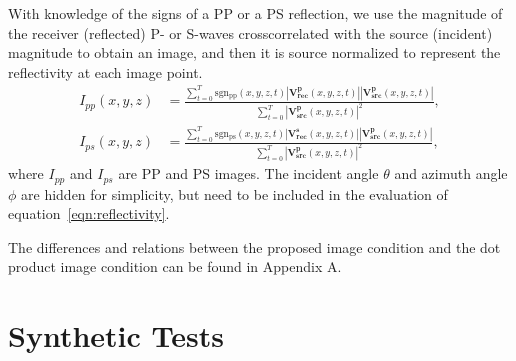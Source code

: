\documentclass[manuscript,ulem,graphix,revised]{geophysics}
\begin{document}
With knowledge of the signs of a PP or a PS reflection, we use the magnitude of the receiver (reflected) P- or S-waves crosscorrelated with the source (incident) magnitude to obtain an image, and then it is source normalized to represent the reflectivity \citep{sheriff95} at each image point.
\begin{equation}
\begin{aligned}
I_{pp}(x,y,z)&=\frac{\sum_{t=0}^{T}\mathrm{sgn_{pp}}(x,y,z,t)|\mathbf{V^p_{rec}}(x,y,z,t)||\mathbf{V^p_{src}}(x,y,z,t)|}
                    {\sum_{t=0}^{T}|\mathbf{V^p_{src}}(x,y,z,t)|^2 },\\
I_{ps}(x,y,z)&=\frac{\sum_{t=0}^{T}\mathrm{sgn_{ps}}(x,y,z,t)|\mathbf{V^s_{rec}}(x,y,z,t)||\mathbf{V^p_{src}}(x,y,z,t)|}
                    {\sum_{t=0}^{T}|\mathbf{V^p_{src}}(x,y,z,t)|^2 },
\end{aligned}
\label{eqn:reflectivity}
\end{equation}
where $I_{pp}$ and $I_{ps}$ are PP and PS images. The incident angle $\theta$ and azimuth angle $\phi$ are hidden for simplicity, but need to be included in the evaluation of equation~\ref{eqn:reflectivity}.

The differences and relations between the proposed image condition and the dot product image condition \citep{wang_cl16, du17} can be found in Appendix A.



\section{Synthetic Tests}
\end{document}
